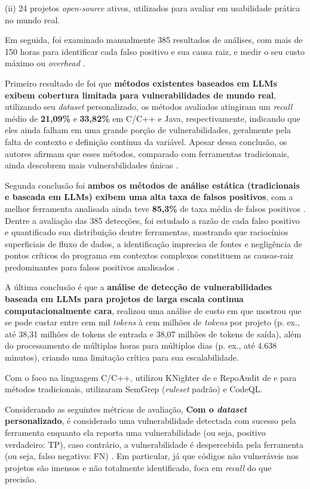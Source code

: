 \documentclass[
    12pt,                %
    openright,           %
    oneside,             %
    a4paper,             %
    english,             %
    brazil               %
]{abntex2}
\begin{document}
\begin{itemize}
(ii) 24 projetos \textit{open-source} ativos, utilizados para avaliar em usabilidade prática no mundo real.
\par
Em seguida, foi examinado manualmente 385 resultados de análises, com mais de 150 horas para identificar cada falso positivo e sua causa raiz, e medir o seu custo máximo ou \textit{overhead} \cite{li2026llmbased}.
\par
Primeiro resultado de  foi que \textbf{métodos existentes baseados em LLMs exibem cobertura limitada para vulnerabilidades de mundo real}, utilizando seu \textit{dataset} personalizado, os métodos avaliados atingiram um \textit{recall} médio de \textbf{21,09\%} e \textbf{33,82\%} em C/C++ e Java, respectivamente, indicando que eles ainda falham em uma grande porção de vulnerabilidades, geralmente pela falta de contexto e definição contínua da variável.
Apesar dessa conclusão, os autores afirmam que esses métodos, comparado com ferramentas tradicionais, ainda descobrem mais vulnerabilidades únicas \cite{li2026llmbased}.
\par
Segunda conclusão foi \textbf{ambos os métodos de análise estática (tradicionais e baseada em LLMs) exibem uma alta taxa de falsos positivos}, com a melhor ferramenta analisada ainda teve \textbf{85,3\%} de taxa média de falsos positivos \cite{li2026llmbased}.
Dentre a avaliação das 385 detecções, foi estudado a razão de cada falso positivo e quantificado sua distribuição dentre ferramentas, mostrando que raciocínios superficiais de fluxo de dados, a identificação imprecisa de fontes e negligência de pontos críticos do programa em contextos complexos constituem as causas-raiz predominantes para falsos positivos analisados \cite{li2026llmbased}.
\par
A última conclusão é que a \textbf{análise de detecção de vulnerabilidades baseada em LLMs para projetos de larga escala continua computacionalmente cara},  realizou uma análise de custo em que mostrou que se pode custar entre cem mil \textit{tokens} à cem milhões de \textit{tokens} por projeto (p. ex., até 38,31 milhões de tokens de entrada e 38,07 milhões de tokens de saída), além do processamento de múltiplas horas para múltiplos dias (p. ex., até 4.638 minutos), criando uma limitação crítica para sua escalabilidade.
\par
Com o foco na linguagem C/C++,  utilizou KNighter de  e RepoAudit de  e para métodos tradicionais, utilizaram SemGrep (\textit{ruleset} padrão) e CodeQL.
\par
Considerando as seguintes métricas de avaliação, \textbf{Com o \textit{dataset} personalizado}, é considerado uma vulnerabilidade detectada com sucesso pela ferramenta enquanto ela reporta uma vulnerabilidade (ou seja, positivo verdadeiro: TP), caso contrário, a vulnerabilidade é despercebida pela ferramenta (ou seja, falso negativo: FN) \cite{li2026llmbased}.
Em particular, já que códigos não vulneráveis nos projetos são imensos e não totalmente identificado,  foca em \textit{recall} do que precisão.


\end{itemize}
\end{document}
